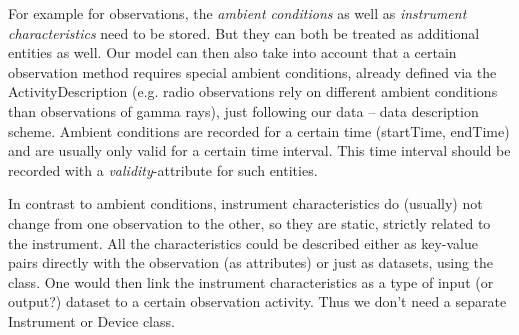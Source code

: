 For example for observations, the \emph{ambient conditions} as well as 
\emph{instrument characteristics} need to be stored. But they can both be treated
as additional entities as well. 
Our model can then also take into account that a certain observation
method requires special ambient conditions, already defined via the 
ActivityDescription (e.g. radio observations rely on different ambient 
conditions than observations
of gamma rays), just following our data -- data description scheme.
Ambient conditions are recorded for a certain time (startTime, endTime) and are
usually only valid for a certain time interval. This time interval should be recorded
with a \emph{validity}-attribute for such entities.

In contrast to ambient conditions, instrument characteristics do (usually) not
change from one observation to the other, so they are static, strictly related to
the instrument. 
All the characteristics could be described either as key-value pairs directly with the 
observation (as attributes) or just as datasets, using the  class. 
One would then 
link the instrument characteristics as a type of input (or output?) dataset to a certain 
observation activity. Thus we don't need a separate Instrument or Device class.

